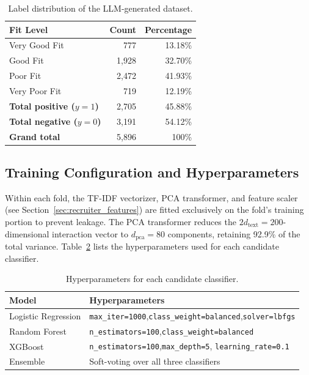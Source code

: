 \begin{table}[htbp]
    \centering
    \caption{Label distribution of the LLM-generated dataset.}
    \label{tab:recruiter_label_dist}
    \begin{tabular}{lrr}
        \toprule
        \textbf{Fit Level} & \textbf{Count} & \textbf{Percentage} \\
        \midrule
        Very Good Fit &   777 & 13.18\% \\
        Good Fit      & 1,928 & 32.70\% \\
        Poor Fit      & 2,472 & 41.93\% \\
        Very Poor Fit &   719 & 12.19\% \\
        \midrule
        \textbf{Total positive ($y=1$)} & 2,705 & 45.88\% \\
        \textbf{Total negative ($y=0$)} & 3,191 & 54.12\% \\
        \textbf{Grand total}            & 5,896 & 100\% \\
        \bottomrule
    \end{tabular}
\end{table}

\subsection{Training Configuration and Hyperparameters}
\label{sec:exp_recruiter_training_config}
Within each fold, the \gls{TF-IDF} vectorizer, \gls{PCA} transformer, 
and feature scaler (see Section~\ref{sec:recruiter_features}) are fitted exclusively on the fold's training 
portion to prevent leakage. The \gls{PCA} transformer reduces the 
$2d_{\text{text}} = 200$-dimensional interaction vector to 
$d_{\text{pca}} = 80$ components, retaining 92.9\% of the total 
variance. Table~\ref{tab:recruiter_hyperparams} lists the 
hyperparameters used for each candidate classifier.
\begin{table}[H]
    \centering
    \caption{Hyperparameters for each candidate classifier.}
    \label{tab:recruiter_hyperparams}
    \begin{tabular}{p{3.4cm}p{8.6cm}}
        \toprule
        \textbf{Model} & \textbf{Hyperparameters} \\
        \midrule
        Logistic Regression & \texttt{max\_iter=1000},\newline \texttt{class\_weight=balanced},\newline \texttt{solver=lbfgs} \\
        \midrule
        Random Forest       & \texttt{n\_estimators=100},\newline \texttt{class\_weight=balanced} \\
        \midrule
        XGBoost & \texttt{n\_estimators=100},\newline \texttt{max\_depth=5}, \newline
          \texttt{learning\_rate=0.1}\\
        \midrule
        Ensemble            & Soft-voting over all three classifiers \\
        \bottomrule
    \end{tabular}
\end{table}

